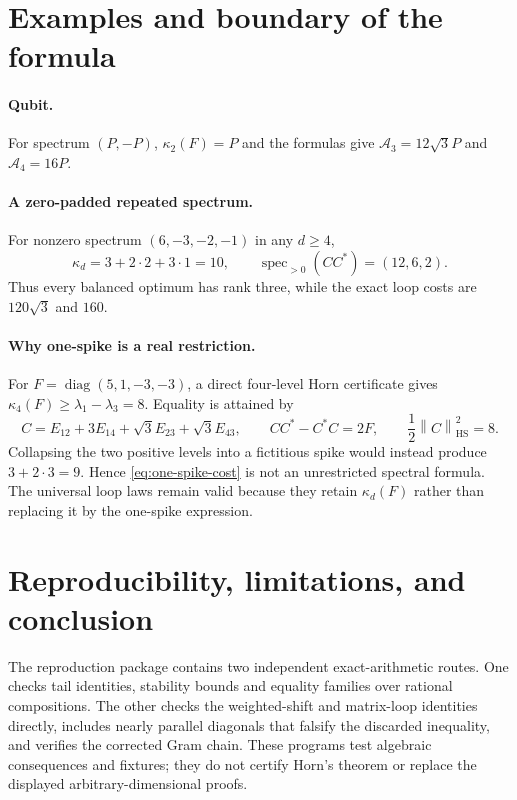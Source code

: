 \documentclass[11pt]{article}
\theoremstyle{definition}
\theoremstyle{remark}
\newcommand{\diag}{\operatorname{diag}}
\newcommand{\spec}{\operatorname{spec}}
\newcommand{\1}{\mathbf 1}
\newcommand{\norm}[1]{\left\lVert#1\right\rVert}
\newcommand{\HS}{\mathrm{HS}}
\begin{document}
\section{Examples and boundary of the formula}

\paragraph{Qubit.}
For spectrum $(P,-P)$, $\kappa_2(F)=P$ and the formulas give
$\mathcal A_3=12\sqrt3P$ and $\mathcal A_4=16P$.

\paragraph{A zero-padded repeated spectrum.}
For nonzero spectrum $(6,-3,-2,-1)$ in any $d\ge4$,
\[
 \kappa_d=3+2\cdot2+3\cdot1=10,
 \qquad \spec_{>0}(CC^*)=(12,6,2).
\]
Thus every balanced optimum has rank three, while the exact loop costs are
$120\sqrt3$ and $160$.

\paragraph{Why one-spike is a real restriction.}
For $F=\diag(5,1,-3,-3)$, a direct four-level Horn certificate gives
$\kappa_4(F)\ge\lambda_1-\lambda_3=8$.  Equality is attained by
\[
 C=E_{12}+3E_{14}+\sqrt3E_{23}+\sqrt3E_{43},
 \qquad CC^*-C^*C=2F,
 \qquad \frac12\norm C_{\HS}^2=8.
\]
Collapsing the two positive levels into a fictitious spike would instead
produce $3+2\cdot3=9$.  Hence \eqref{eq:one-spike-cost} is not an unrestricted
spectral formula.  The universal loop laws remain valid because they retain
$\kappa_d(F)$ rather than replacing it by the one-spike expression.

\section{Reproducibility, limitations, and conclusion}

The reproduction package contains two independent exact-arithmetic routes.
One checks tail identities, stability bounds and equality families over
rational compositions.  The other checks the weighted-shift and matrix-loop
identities directly, includes nearly parallel diagonals that falsify the
discarded inequality, and verifies the corrected Gram chain.  These programs
test algebraic consequences and fixtures; they do not certify Horn's theorem
or replace the displayed arbitrary-dimensional proofs.
\end{document}
